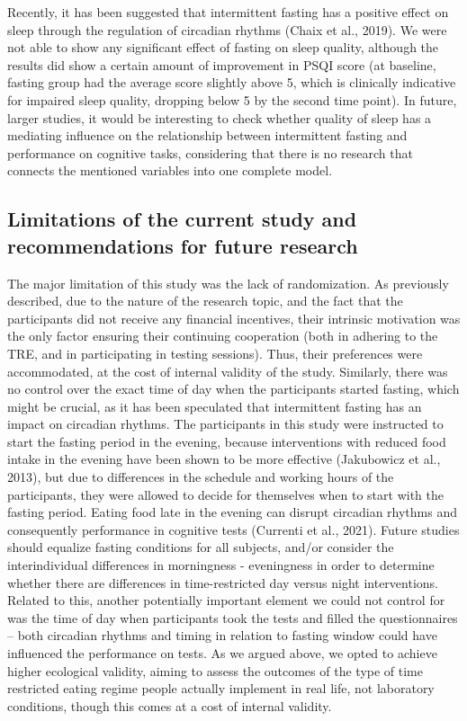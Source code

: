 \documentclass[authordate, empirical]{jote-new-article}
\begin{document}
Recently, it has been suggested that intermittent fasting has a positive effect on sleep through the regulation of circadian rhythms (Chaix et al., 2019). We were not able to show any significant effect of fasting on sleep quality, although the results did show a certain amount of improvement in PSQI score (at baseline, fasting group had the average score slightly above 5, which is clinically indicative for impaired sleep quality, dropping below 5 by the second time point). In future, larger studies, it would be interesting to check whether quality of sleep has a mediating influence on the relationship between intermittent fasting and performance on cognitive tasks, considering that there is no research that connects the mentioned variables into one complete model.








\subsection{Limitations of the current study and recommendations for future research}



The major limitation of this study was the lack of randomization. As previously described, due to the nature of the research topic, and the fact that the participants did not receive any financial incentives, their intrinsic motivation was the only factor ensuring their continuing cooperation (both in adhering to the TRE, and in participating in testing sessions). Thus, their preferences were accommodated, at the cost of internal validity of the study. Similarly, there was no control over the exact time of day when the participants started fasting, which might be crucial, as it has been speculated that intermittent fasting has an impact on circadian rhythms. The participants in this study were instructed to start the fasting period in the evening, because interventions with reduced food intake in the evening have been shown to be more effective (Jakubowicz et al., 2013), but due to differences in the schedule and working hours of the participants, they were allowed to decide for themselves when to start with the fasting period. Eating food late in the evening can disrupt circadian rhythms and consequently performance in cognitive tests (Currenti et al., 2021). Future studies should equalize fasting conditions for all subjects, and/or consider the interindividual differences in morningness - eveningness in order to determine whether there are differences in time-restricted day versus night interventions. Related to this, another potentially important element we could not control for was the time of day when participants took the tests and filled the questionnaires -- both circadian rhythms and timing in relation to fasting window could have influenced the performance on tests. As we argued above, we opted to achieve higher ecological validity, aiming to assess the outcomes of the type of time restricted eating regime people actually implement in real life, not laboratory conditions, though this comes at a cost of internal validity.
\end{document}
